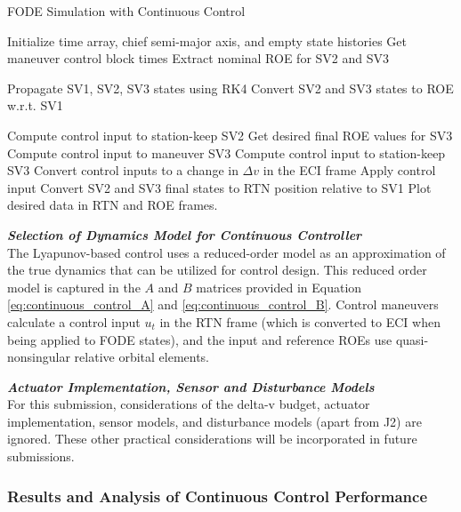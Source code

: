 \begin{algorithm}[H]
\caption{FODE Simulation with Continuous Control}
\begin{algorithmic}[1]

\State Initialize time array, chief semi-major axis, and empty state histories
\State Get maneuver control block times
\State Extract nominal ROE for SV2 and SV3

    \State Propagate SV1, SV2, SV3 states using RK4
    \State Convert SV2 and SV3 states to ROE w.r.t. SV1

    \State Compute control input to station-keep SV2
        \State Get desired final ROE values for SV3
        \State Compute control input to maneuver SV3
    \Else
        \State Compute control input to station-keep SV3
    \EndIf
    \State Convert control inputs to a change in $\Delta v$ in the ECI frame
    \State Apply control input
\EndFor
\State Convert SV2 and SV3 final states to RTN position relative to SV1
\State Plot desired data in RTN and ROE frames.
\EndProcedure
\end{algorithmic}
\end{algorithm} \label{alg:continuous_control_sim}

\textbf{\textit{Selection of Dynamics Model for Continuous Controller}} \\
The Lyapunov-based control uses a reduced-order model as an approximation of the true dynamics that can be utilized for control design. This reduced order model is captured in the $A$ and $B$ matrices provided in Equation \ref{eq:continuous_control_A} and \ref{eq:continuous_control_B}. Control maneuvers calculate a control input $u_t$ in the RTN frame (which is converted to ECI when being applied to FODE states), and the input and reference ROEs use quasi-nonsingular relative orbital elements.

\textbf{\textit{Actuator Implementation, Sensor and Disturbance Models}} \\
For this submission, considerations of the delta-v budget, actuator implementation, sensor models, and disturbance models (apart from J2) are ignored. These other practical considerations will be incorporated in future submissions.

\subsubsection{Results and Analysis of Continuous Control Performance} \label{sec:analysis_of_control_cont}

